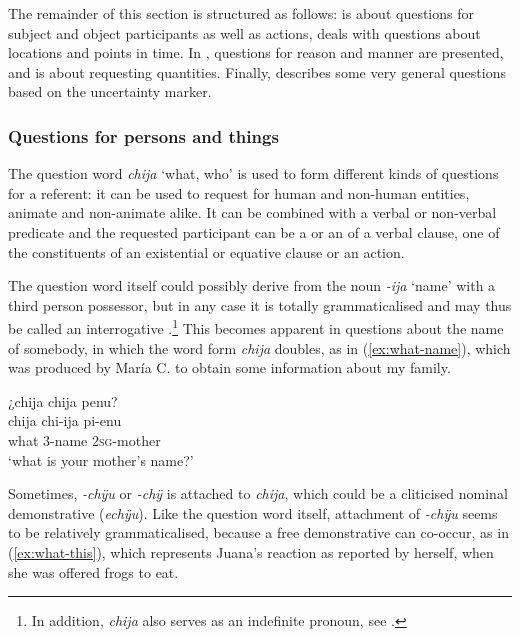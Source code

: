The remainder of this section is structured as follows:  is about questions for subject and object participants as well as actions,  deals with questions about locations and points in time. In , questions for reason and manner are presented, and  is about requesting quantities. Finally,  describes some very general questions based on the uncertainty marker. 

\subsubsection{Questions for persons and things}\label{sec:Q_chija}

The question word  \textit{chija} ‘what, who’ is used to form different kinds of questions for a referent: it can be used to request for human and non-human entities, animate and non-animate alike. It can be combined with a verbal or non-verbal predicate and the requested participant can be a  or an  of a verbal clause, one of the constituents of an existential or equative clause or an action.

The question word itself could possibly derive from the noun \textit{-ija} ‘name’ with a third person possessor, but in any case it is totally grammaticalised and may thus be called an interrogative .\footnote{In addition, \textit{chija} also serves as an indefinite pronoun, see .} This becomes apparent in questions about the name of somebody, in which the word form \textit{chija} doubles, as in (\ref{ex:what-name}), which was produced by María C. to obtain some information about my family.

\ea\label{ex:what-name}
\begingl
\glpreamble ¿chija chija penu?\\
\gla chija chi-ija pi-enu\\
\glb what 3-name 2\textsc{sg}-mother\\
\glft ‘what is your mother’s name?’
\endgl
\trailingcitation{[uxx-p110825l.144]}
\xe

Sometimes, \textit{-chÿu} or \textit{-chÿ} is attached to \textit{chija}, which could be a cliticised nominal demonstrative (\textit{echÿu}). Like the question word itself, attachment of \textit{-chÿu} seems to be relatively grammaticalised, because a free demonstrative can co-occur, as in (\ref{ex:what-this}), which represents Juana’s reaction as reported by herself, when she was offered frogs to eat.

